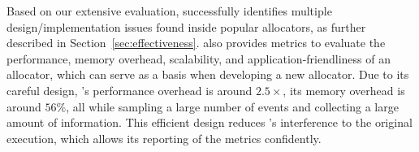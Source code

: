 

Based on our extensive evaluation, \MP{} successfully identifies multiple design/implementation issues found inside popular allocators, as further described in Section~\ref{sec:effectiveness}. \MP{} also provides metrics to evaluate the performance, memory overhead, scalability, and application-friendliness of an allocator, which can serve as a basis when developing a new allocator. Due to its careful design, \MP{}'s performance overhead is around $2.5\times$, its memory overhead is around $56\%$, all while sampling a large number of events and collecting a large amount of information. This efficient design reduces \MP{}'s interference to the original execution, which allows its reporting of the metrics confidently. 

